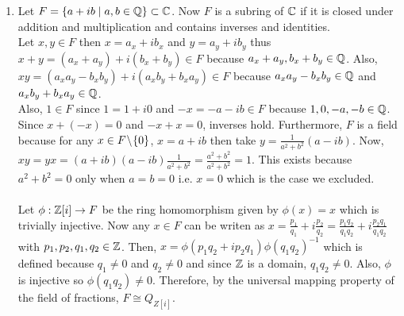 \documentclass[12pt]{extarticle}
\begin{document}
\begin{enumerate}
\item Let $F = \{a + ib \mid a, b \in \mathbb{Q} \} \subset \mathbb{C}$. Now $F$ is a subring of $\mathbb{C}$ if it is closed under addition and multiplication and contains inverses and identities.\\

Let $x, y \in F$ then $x = a_x + ib_x$ and $y = a_y + ib_y$ thus $x + y = (a_x + a_y) + i (b_x + b_y) \in F$ because $a_x + a_y, b_x + b_y \in \mathbb{Q}$. Also, $xy = (a_x a_y - b_x b_y) + i (a_x b_y + b_x a_y) \in F$ because $a_x a_y - b_x b_y \in \mathbb{Q}$ and  $a_x b_y + b_x a_y \in \mathbb{Q}$. \\

Also, $1 \in F$ since $1 = 1+i0$ and $-x = -a - ib \in F$ because $1,0, -a, -b \in \mathbb{Q}$. Since $x + (-x) = 0$ and $-x + x = 0$, inverses hold. Furthermore, $F$ is a field because for any $x \in F \! \setminus \! \{0\}$, $x = a + ib$ then take $y = \frac{1}{a^2 + b^2} (a-ib)$. Now, $xy = yx = (a+ib)(a-ib)\frac{1}{a^2 + b^2} = \frac{a^2 + b^2}{a^2 + b^2} = 1$. This exists because $a^2 + b^2 = 0$ only when $a = b = 0$ i.e. $x = 0$ which is the case we excluded. \\ \\

Let $\phi : \mathbb{Z}[i] \rightarrow F$ be the ring homomorphism given by $\phi(x) = x$ which is trivially injective. Now any $x \in F$ can be writen as $x = \frac{p_1}{q_1} + i \frac{p_2}{q_2} = \frac{p_1 q_2}{q_1 q_2} + i \frac{p_2 q_1}{q_1 q_2}$ with $p_1, p_2, q_1, q_2 \in \mathbb{Z}$. Then, $x = \phi(p_1 q_2 + i p_2 q_1) \phi(q_1 q_2)^{-1}$ which is defined because $q_1 \neq 0$ and $q_2 \neq 0$ and since $\mathbb{Z}$ is a domain, $q_1 q_2 \neq 0$. Also, $\phi$ is injective so $\phi(q_1 q_2) \neq 0$. Therefore, by the universal mapping property of the field of fractions, $F \cong Q_{Z[i]}$. 

\end{enumerate}
\end{document}
